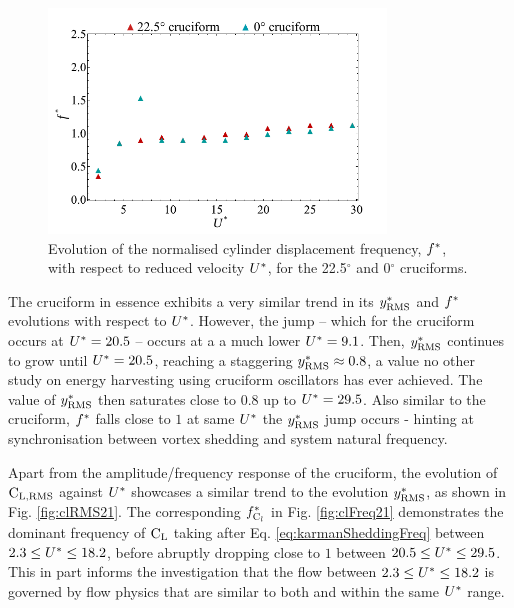 \documentclass[oneside]{utmthesis}
\begin{document}
\begin{figure}[H]
  \centering
  \hspace{1cm} \includegraphics[width=0.8\textwidth]{figs/yStrFreq21}
  \caption{Evolution of the normalised cylinder displacement frequency, $f^{*}$, with respect to reduced velocity $U^{*}$, for the 22.5$^{\circ}$ and 0$^{\circ}$ cruciforms.}
  \label{fig:yStrFreq21}
\end{figure}

The \angon{} cruciform in essence exhibits a very similar trend in its $y^{*}_{\text{RMS}}$ and $f^{*}$ evolutions with respect to $U^{*}$. However, the jump -- which for the \angtw{} cruciform occurs at $U^{*} = 20.5$ -- occurs at a a much lower $U^{*} = 9.1$. Then, $y^{*}_{\text{RMS}}$ continues to grow until $U^{*} = 20.5$, reaching a staggering $y^{*}_{\text{RMS}} \approx 0.8$, a value no other study on energy harvesting using cruciform oscillators has ever achieved. The value of $y^{*}_{\text{RMS}}$ then saturates close to $0.8$ up to $U^{*} = 29.5$. Also similar to the \angtw{} cruciform, $f^{*}$ falls close to $1$ at same $U^{*}$ the $y^{*}_{\text{RMS}}$ jump occurs - hinting at synchronisation between vortex shedding and system natural frequency.

Apart from the amplitude/frequency response of the \angtw{} cruciform, the evolution of $\text{C}_{\text{L,RMS}}$ against $U^{*}$ showcases a similar trend to the evolution $y^{*}_{\text{RMS}}$, as shown in Fig. \ref{fig:clRMS21}. The corresponding $f_{\text{C}_{l}}^{*}$ in Fig. \ref{fig:clFreq21} demonstrates the dominant frequency of $\text{C}_{\text{L}}$ taking after Eq. \ref{eq:karmanSheddingFreq} between $2.3 \leq U^{*} \leq 18.2$, before abruptly dropping close to $1$ between $20.5 \leq U^{*} \leq 29.5$. This in part informs the investigation that the flow between $2.3 \leq U^{*} \leq 18.2$ is governed by flow physics that are similar to both \angfo{} and \angth{} within the same $U^{*}$ range.
\end{document}
